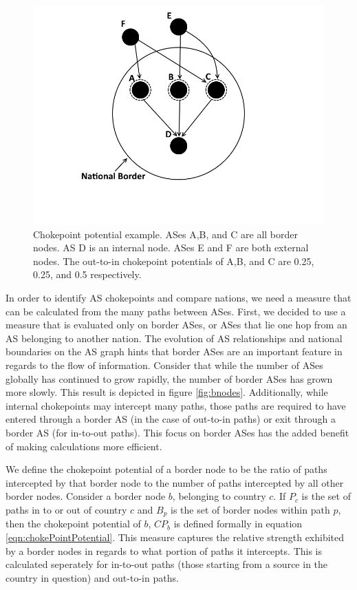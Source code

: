 \documentclass[10pt, conference, letterpaper]{IEEEtran}
\begin{document}
\begin{figure}
	\centering
	\includegraphics[width=\linewidth]{chokepoint}
	\caption{Chokepoint potential example. ASes A,B, and C are all border nodes. 
						AS D is an internal node. ASes E and F are both external nodes.
						The out-to-in chokepoint potentials of A,B, and C are 0.25, 0.25, and 0.5 respectively.}\label{fig:chokepoint}
\end{figure}

In order to identify AS chokepoints and compare nations, we need a measure that can be calculated from the many paths between
ASes. First, we decided to use a measure that is evaluated only on border ASes, or ASes that lie one hop from an AS belonging to another nation. 
The evolution of AS relationships and national boundaries on the AS graph hints that border ASes are an important feature in regards to the flow
of information. Consider that while the number of ASes globally has continued to grow rapidly, the number of border ASes has grown more slowly.
This result is depicted in figure \ref{fig:bnodes}. Additionally, while internal chokepoints may intercept many paths, those paths are required
to have entered through a border AS (in the case of out-to-in paths) or exit through a border AS (for in-to-out paths). This focus on border ASes has
the added benefit of making calculations more efficient.

\par
We define the chokepoint potential of a border node to be the ratio of paths intercepted by that border node
to the number of paths intercepted by all other border nodes. Consider a border node $b$, belonging to country $c$.
If $P_c$ is the set of paths in to or out of country $c$ and $B_p$ is the set of border nodes within path $p$, then the
chokepoint potential of $b$, $CP_b$ is defined formally in equation \ref{eqn:chokePointPotential}. This measure captures
the relative strength exhibited by a border nodes in regards to what portion of paths it intercepts. This is calculated
seperately for in-to-out paths (those starting from a source in the country in question) and out-to-in paths.
\end{document}
